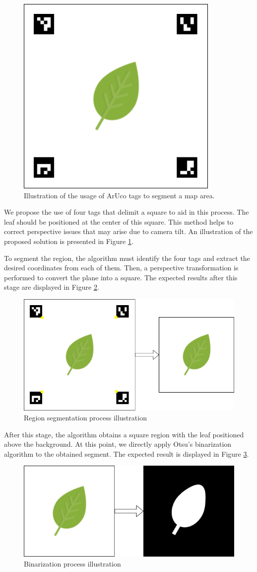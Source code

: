 \begin{figure}[h!]
    \centering
    \includegraphics[width = .4\linewidth]{Figures/illustration.png}
    \caption{Illustration of the usage of ArUco tags to segment a map area.}
    \label{fig:illustration}
\end{figure}

We propose the use of four tags that delimit a square to aid in this process. The leaf should be positioned at the center of this square. This method helps to correct perspective issues that may arise due to camera tilt. An illustration of the proposed solution is presented in Figure \ref{fig:illustration}.

To segment the region, the algorithm must identify the four tags and extract the desired coordinates from each of them. Then, a perspective transformation is performed to convert the plane into a square. The expected results after this stage are displayed in Figure \ref{fig:stage-2}.

\begin{figure}[h!]
    \centering
    \includegraphics[width = .5\linewidth]{Figures/stage-2.png}
    \caption{Region segmentation process illustration}
    \label{fig:stage-2}
\end{figure}

After this stage, the algorithm obtains a square region with the leaf positioned above the background. At this point, we directly apply Otsu's binarization algorithm to the obtained segment. The expected result is displayed in Figure \ref{fig:stage-3}.

\begin{figure}[h!]
    \centering
    \includegraphics[width = .5\linewidth]{Figures/stage-3.png}
    \caption{Binarization process illustration}
    \label{fig:stage-3}
\end{figure}

